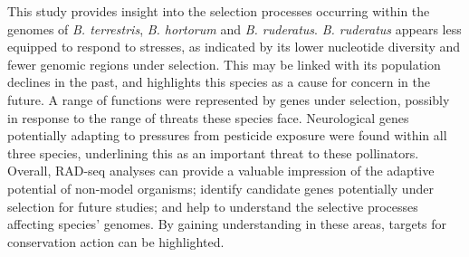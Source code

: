 \documentclass[12pt]{article}
\begin{document}
\begin{linenumbers}
		This study provides insight into the selection processes occurring within the genomes of \emph{B. terrestris}, \emph{B. hortorum} and \emph{B. ruderatus}. \emph{B. ruderatus} appears less equipped to respond to stresses, as indicated by its lower nucleotide diversity and fewer genomic regions under selection. This may be linked with its population declines in the past, and highlights this species as a cause for concern in the future. 
		A range of functions were represented by genes under selection, possibly in response to the range of threats these species face.
		Neurological genes potentially adapting to pressures from pesticide exposure were found within all three species, underlining this as an important threat to these pollinators. 
		Overall, RAD-seq analyses can provide a valuable impression of the adaptive potential of non-model organisms; identify candidate genes potentially under selection for future studies; and help to understand the selective processes affecting species' genomes.
		By gaining understanding in these areas, targets for conservation action can be highlighted.
		
		
%		
		
    	
    	
    	
    	\newpage





\end{linenumbers}
\end{document}
